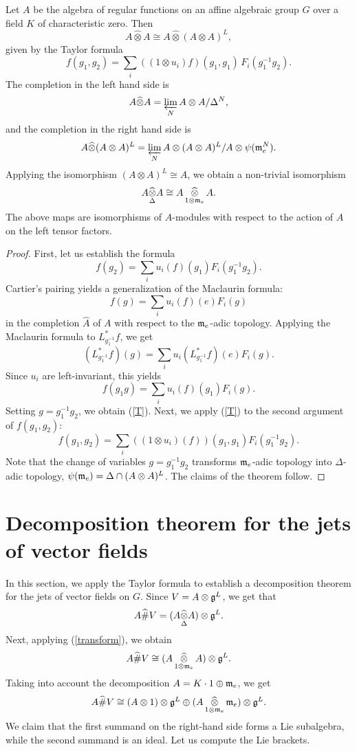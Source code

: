 \documentclass[12pt]{amsart}
\begin{document}
\begin{theorem} 
\label{Taylor}
Let $A$ be the algebra of regular functions on an affine algebraic group $G$ over a field $K$ of characteristic zero. Then
$$A \widehat\otimes A \cong A \widehat\otimes (A \otimes A)^L,$$
given by the Taylor formula
$$f(g_1, g_2) = \sum_i ( (1 \otimes u_i) f) (g_1, g_1) \,F_i (g_1^{-1} g_2).$$
The completion in the left hand side is
$$A \widehat\otimes A = \varprojlim_N A \otimes A/ \Delta^N,$$
and the completion in the right hand side is
$$A \widehat\otimes (A \otimes A)^L = \varprojlim_N A \otimes (A \otimes A)^L / A \otimes \psi(\mathfrak{m}_e^N).$$
Applying the isomorphism $(A \otimes A)^L \cong A$, we obtain a non-trivial isomorphism
\begin{equation}
\label{transform}
A \widehat{\mathop\otimes\limits_\Delta} A \cong A \mathop{\widehat\otimes}\limits_{1 \otimes \mathfrak{m}_e} A.
\end{equation}
The above maps are isomorphisms of $A$-modules with respect to the action of $A$ on the left tensor factors.
\end{theorem}
\begin{proof}
First, let us establish the formula
\begin{equation}
\label{T}
f(g_2) = \sum_i u_i (f) (g_1) F_i(g_1^{-1} g_2).
\end{equation}
Cartier's pairing yields a generalization of the Maclaurin formula:
$$f(g) = \sum_i u_i (f) (e) F_i (g)$$
in the completion $\widehat{A}$ of $A$ with respect to the $\mathfrak{m}_e$-adic topology. Applying the Maclaurin
formula to $L^*_{g_1^{-1}} f$, we get
$$(L^*_{g_1^{-1}}f)(g) = \sum_i u_i (L^*_{g_1^{-1}} f) (e) F_i (g).$$
Since $u_i$ are left-invariant, this yields
$$f( g_1 g) = \sum_i u_i (f) (g_1) F_i(g).$$
Setting $g = g_1^{-1} g_2$, we obtain (\ref{T}).
Next, we apply (\ref{T}) to the second argument of $f(g_1, g_2)$:
$$f(g_1, g_2) = \sum_i ((1 \otimes u_i) (f)) (g_1, g_1) F_i(g_1^{-1} g_2).$$
Note that the change of variables $g = g_1^{-1} g_2$ transforms $\mathfrak{m}_e$-adic topology into $\Delta$-adic topology, $\psi(\mathfrak{m}_e) = \Delta \cap (A \otimes A)^L$. The claims of the theorem follow.
\end{proof}

\section{Decomposition theorem for the jets of vector fields}

In this section, we apply the Taylor formula to establish a decomposition theorem for the jets of vector fields on $G$. Since $V = A \otimes \mathfrak{g}^L$, we get that 
$$A \widehat\# V = (A \widehat{\mathop\otimes\limits_\Delta} A ) \otimes \mathfrak{g}^L.$$
Next, applying (\ref{transform}), we obtain
$$A \widehat\# V \cong 
(A \mathop{\widehat\otimes}\limits_{1 \otimes \mathfrak{m}_e} A) \otimes \mathfrak{g}^L.$$
Taking into account the decomposition $A = K \cdot 1 \oplus \mathfrak{m}_e$, we get 
$$A \widehat\# V \cong (A \otimes 1) \otimes \mathfrak{g}^L \oplus  
(A \mathop{\widehat\otimes}\limits_{1 \otimes \mathfrak{m}_e} \mathfrak{m}_e) \otimes \mathfrak{g}^L.$$
We claim that the first summand on the right-hand side forms a Lie subalgebra, while the second summand is an ideal. Let us compute the Lie brackets.
\end{document}
